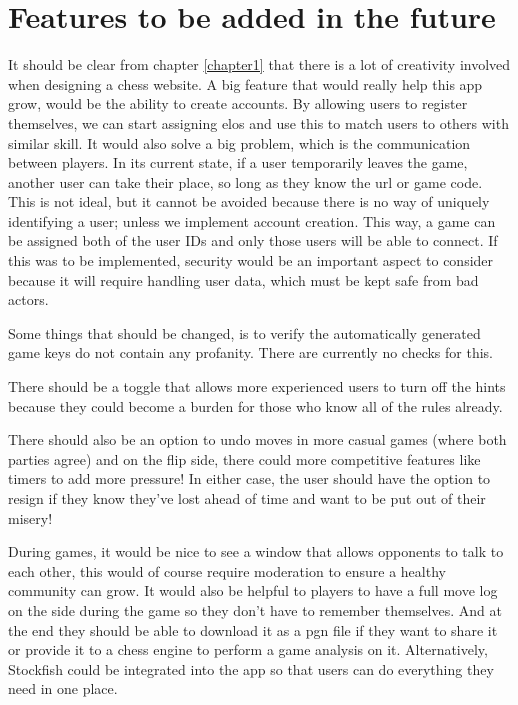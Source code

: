 \section{Features to be added in the future}
\label{futureDevelopment}

It should be clear from chapter \ref{chapter1} that there is a lot of creativity involved when designing a chess website. A big feature that would really help this app grow, would be the ability to create accounts. By allowing users to register themselves, we can start assigning elos and use this to match users to others with similar skill. It would also solve a big problem, which is the communication between players. In its current state, if a user temporarily leaves the game, another user can take their place, so long as they know the url or game code. This is not ideal, but it cannot be avoided because there is no way of uniquely identifying a user; unless we implement account creation. This way, a game can be assigned both of the user IDs and only those users will be able to connect. If this was to be implemented, security would be an important aspect to consider because it will require handling user data, which must be kept safe from bad actors.

Some things that should be changed, is to verify the automatically generated game keys do not contain any profanity. There are currently no checks for this.

There should be a toggle that allows more experienced users to turn off the hints because they could become a burden for those who know all of the rules already. 

There should also be an option to undo moves in more casual games (where both parties agree) and on the flip side, there could more competitive features like timers to add more pressure! In either case, the user should have the option to resign if they know they've lost ahead of time and want to be put out of their misery!

During games, it would be nice to see a window that allows opponents to talk to each other, this would of course require moderation to ensure a healthy community can grow. It would also be helpful to players to have a full move log on the side during the game so they don't have to remember themselves. And at the end they should be able to download it as a pgn file if they want to share it or provide it to a chess engine to perform a game analysis on it. Alternatively, Stockfish could be integrated into the app so that users can do everything they need in one place.

